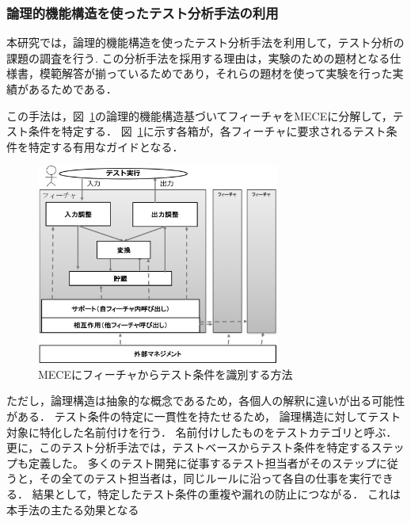 \documentclass[10pt,a4j]{jarticle}
\begin{document}
\subsubsection{論理的機能構造を使ったテスト分析手法の利用}
本研究では，論理的機能構造を使ったテスト分析手法を利用して，テスト分析の課題の調査を行う.
この分析手法を採用する理由は，実験のための題材となる仕様書，模範解答が揃っているためであり，それらの題材を使って実験を行った実績があるためである．

この手法は，図~\ref{fig:D-3-Fig3}の論理的機能構造基づいてフィーチャをMECEに分解して，テスト条件を特定する．
図~\ref{fig:D-3-Fig3}に示す各箱が，各フィーチャに要求されるテスト条件を特定する有用なガイドとなる．

\begin{figure}[h]
  \begin{center}
	\includegraphics[width=8cm]{./image/D-3-Fig3.png}
	\caption{MECEにフィーチャからテスト条件を識別する方法}
	\label{fig:D-3-Fig3}
  \end{center}
\end{figure}

ただし，論理構造は抽象的な概念であるため，各個人の解釈に違いが出る可能性がある．
テスト条件の特定に一貫性を持たせるため， 論理構造に対してテスト対象に特化した名前付けを行う．
名前付けしたものをテストカテゴリと呼ぶ．
更に，このテスト分析手法では，テストベースからテスト条件を特定するステップも定義した。
多くのテスト開発に従事するテスト担当者がそのステップに従うと，その全てのテスト担当者は，同じルールに沿って各自の仕事を実行できる．
結果として，特定したテスト条件の重複や漏れの防止につながる．
これは本手法の主たる効果となる


\end{document}
